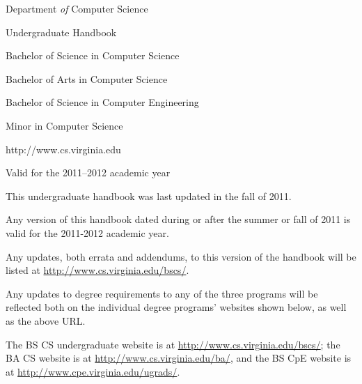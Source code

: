 \documentclass[10pt,letter]{book}
\begin{document}
\pagestyle{empty}

\vspace*{0.5in}

\begin{figure}[h!]
\begin{center}
\end{center}
\end{figure}

\vspace{0.25in}

\begin{center}
{\huge Department {\em of} Computer Science}

{\huge Undergraduate Handbook}

\vspace{1in}

{\Large Bachelor of Science in Computer Science}

{\Large Bachelor of Arts in Computer Science}

{\Large Bachelor of Science in Computer Engineering}

{\Large Minor in Computer Science}

\vspace{1in}

{\large http://www.cs.virginia.edu}

{\large Valid for the 2011--2012 academic year}
\end{center}


\clearpage

\vspace*{1.5in}

\begin{center}
\parbox{3in}
{This undergraduate handbook was last updated in the fall of 2011.
\newline

Any version of this handbook dated during or after the summer or fall
of 2011 is valid for the 2011-2012 academic year.
\newline

Any updates, both errata and addendums, to this version of the
handbook will be listed at \url{http://www.cs.virginia.edu/bscs/}.
\newline

Any updates to degree requirements to any of the three programs will
be reflected both on the individual degree programs' websites shown
below, as well as the above URL.
\newline

The BS CS undergraduate website is at
\url{http://www.cs.virginia.edu/bscs/}; the BA CS website is at
\url{http://www.cs.virginia.edu/ba/}, and the BS CpE website is at
\url{http://www.cpe.virginia.edu/ugrads/}.
\newline

}
\end{center}
\end{document}
